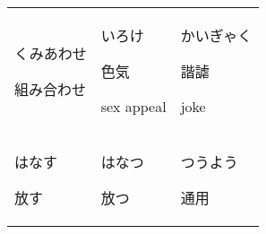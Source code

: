 \documentclass[12pt, a4j, landscape, dvipdfmx]{utarticle}
\begin{document}
    
    \begin{minipage}[t][0pt]{\linewidth }
        \noindent 
        \begin{tabular}{||p{5.5cm}||p{5.5cm}||p{5.5cm}||}
            \hhline{|t:=:t:=:t:=:t|} \rule{0pt}{3ex}
            \hspace*{-.4cm} {\LARGE くみあわせ}\newline
            \rule{0pt}{3ex} \hspace*{.4cm} {\small
            組み合わせ}\newline \rule{0pt}{3ex} \hspace*{.425cm}
            {\small }&\rule{0pt}{3ex} \hspace*{-.4cm}
            {\LARGE いろけ}\newline \rule{0pt}{3ex}
            \hspace*{.4cm} {\small 色気}\newline
            \rule{0pt}{3ex} \hspace*{.425cm} {\small
            sex appeal}&\rule{0pt}{3ex} \hspace*{-.4cm}
            {\LARGE かいぎゃく}\newline \rule{0pt}{3ex}
            \hspace*{.4cm} {\small 諧謔}\newline
            \rule{0pt}{3ex} \hspace*{.425cm} {\small
            joke}\tabularnewline \hhline{|:=::=::=:|}
            \rule{0pt}{3ex} \hspace*{-.4cm} {\LARGE
            はなす}\newline \rule{0pt}{3ex} \hspace*{.4cm}
            {\small 放す}\newline \rule{0pt}{3ex}
            \hspace*{.425cm} {\small }&\rule{0pt}{3ex}
            \hspace*{-.4cm} {\LARGE はなつ}\newline
            \rule{0pt}{3ex} \hspace*{.4cm} {\small
            放つ}\newline \rule{0pt}{3ex} \hspace*{.425cm}
            {\small }&\rule{0pt}{3ex} \hspace*{-.4cm}
            {\LARGE つうよう}\newline \rule{0pt}{3ex}
            \hspace*{.4cm} {\small 通用}\newline

\end{tabular}
\end{minipage}
\end{document}
